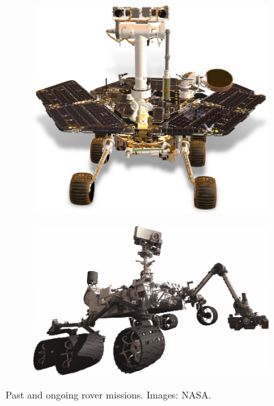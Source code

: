 \begin{figure}[h]
\begin{subfigure}[t]{\subfigureWidth}
        \label{fig:sub:past-mission-rover-sojourner}
	\end{subfigure}\\[0.8ex]
	\begin{subfigure}[t]{\subfigureWidth}
        \centering
		\includegraphics[height=\graphicsHeight]{sections/state-of-the-art/past-missions/images/rover-mer.png}
		\label{fig:sub:past-mission-rovers-mer}
	\end{subfigure}\hspace*{0.5cm}
    \begin{subfigure}[t]{\subfigureWidth}
        \centering
		\includegraphics[height=\graphicsHeight]{sections/state-of-the-art/past-missions/images/rover-msl.png}
		\label{fig:sub:past-mission-rovers-msl}
	\end{subfigure}
    \caption[Past and ongoing rover missions]
            {Past and ongoing rover missions. Images: NASA.}
	\label{fig:past-mission-rovers}
\vspace{-2ex}
\end{figure}

